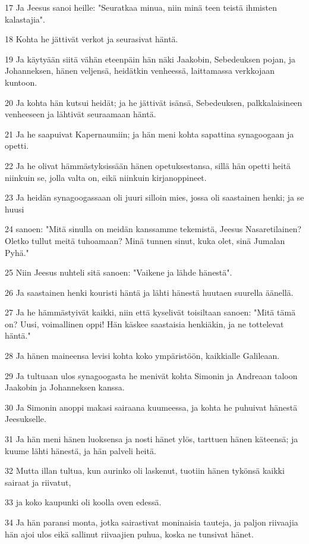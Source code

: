 \par 17 Ja Jeesus sanoi heille: "Seuratkaa minua, niin minä teen teistä ihmisten kalastajia".
\par 18 Kohta he jättivät verkot ja seurasivat häntä.
\par 19 Ja käytyään siitä vähän eteenpäin hän näki Jaakobin, Sebedeuksen pojan, ja Johanneksen, hänen veljensä, heidätkin venheessä, laittamassa verkkojaan kuntoon.
\par 20 Ja kohta hän kutsui heidät; ja he jättivät isänsä, Sebedeuksen, palkkalaisineen venheeseen ja lähtivät seuraamaan häntä.
\par 21 Ja he saapuivat Kapernaumiin; ja hän meni kohta sapattina synagoogaan ja opetti.
\par 22 Ja he olivat hämmästyksissään hänen opetuksestansa, sillä hän opetti heitä niinkuin se, jolla valta on, eikä niinkuin kirjanoppineet.
\par 23 Ja heidän synagoogassaan oli juuri silloin mies, jossa oli saastainen henki; ja se huusi
\par 24 sanoen: "Mitä sinulla on meidän kanssamme tekemistä, Jeesus Nasaretilainen? Oletko tullut meitä tuhoamaan? Minä tunnen sinut, kuka olet, sinä Jumalan Pyhä."
\par 25 Niin Jeesus nuhteli sitä sanoen: "Vaikene ja lähde hänestä".
\par 26 Ja saastainen henki kouristi häntä ja lähti hänestä huutaen suurella äänellä.
\par 27 Ja he hämmästyivät kaikki, niin että kyselivät toisiltaan sanoen: "Mitä tämä on? Uusi, voimallinen oppi! Hän käskee saastaisia henkiäkin, ja ne tottelevat häntä."
\par 28 Ja hänen maineensa levisi kohta koko ympäristöön, kaikkialle Galileaan.
\par 29 Ja tultuaan ulos synagoogasta he menivät kohta Simonin ja Andreaan taloon Jaakobin ja Johanneksen kanssa.
\par 30 Ja Simonin anoppi makasi sairaana kuumeessa, ja kohta he puhuivat hänestä Jeesukselle.
\par 31 Ja hän meni hänen luoksensa ja nosti hänet ylös, tarttuen hänen käteensä; ja kuume lähti hänestä, ja hän palveli heitä.
\par 32 Mutta illan tultua, kun aurinko oli laskenut, tuotiin hänen tykönsä kaikki sairaat ja riivatut,
\par 33 ja koko kaupunki oli koolla oven edessä.
\par 34 Ja hän paransi monta, jotka sairastivat moninaisia tauteja, ja paljon riivaajia hän ajoi ulos eikä sallinut riivaajien puhua, koska ne tunsivat hänet.
